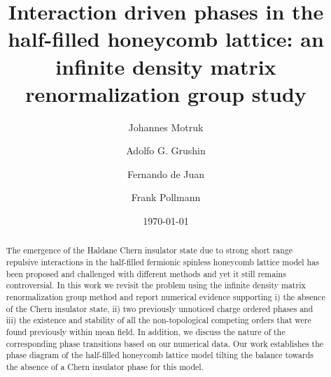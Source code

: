 \documentclass[aps,prx,10pt,twocolumn,floatfix,superscriptaddress,showpacs,numerical,footinbib]{revtex4-1}
\begin{document}
%
\title{Interaction driven phases in the half-filled honeycomb lattice: an infinite density matrix renormalization group study}
%
\author{Johannes Motruk}
\author{Adolfo G. Grushin}
\author{Fernando de Juan}
\author{Frank Pollmann}
%
\date{\today}
%
\begin{abstract}
%
%
The emergence of the Haldane Chern insulator state due to strong short range repulsive interactions in the half-filled fermionic spinless honeycomb lattice
model has been proposed and challenged with different methods and yet it still remains controversial.
%
In this work we revisit the problem using the infinite density matrix renormalization group method and report numerical evidence supporting 
%
i) the absence of the Chern insulator state, 
ii) two previously unnoticed charge ordered phases
and iii) the existence and stability of all the non-topological competing orders that were found previously within mean field.
%
In addition, we discuss the nature of the corresponding phase transitions based on our numerical data.
%
Our work establishes the phase diagram of the half-filled honeycomb lattice model tilting the balance
towards the absence of a Chern insulator phase for this model.
%
\end{abstract}
%
\maketitle
%
\end{document}
